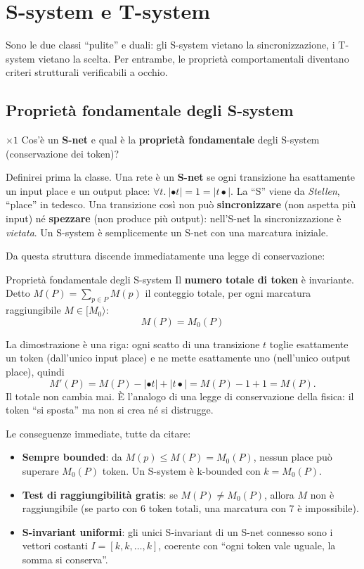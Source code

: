 \chapter{S-system e T-system}

Sono le due classi ``pulite'' e duali: gli S-system vietano la sincronizzazione, i T-system vietano la scelta. Per entrambe, le proprietà comportamentali diventano criteri strutturali verificabili a occhio.

\section{Proprietà fondamentale degli S-system}

\begin{domanda}{$\times 1$}
Cos'è un \textbf{S-net} e qual è la \textbf{proprietà fondamentale} degli S-system (conservazione dei token)?
\end{domanda}

Definirei prima la classe. Una rete è un \textbf{S-net} se ogni transizione ha esattamente un input place e un output place: $\forall t.\ |\bullet t| = 1 = |t\bullet|$. La ``S'' viene da \emph{Stellen}, ``place'' in tedesco. Una transizione così non può \textbf{sincronizzare} (non aspetta più input) né \textbf{spezzare} (non produce più output): nell'S-net la sincronizzazione è \emph{vietata}. Un S-system è semplicemente un S-net con una marcatura iniziale.

Da questa struttura discende immediatamente una legge di conservazione:

\begin{teorema}{Proprietà fondamentale degli S-system}
Il \textbf{numero totale di token} è invariante. Detto $M(P) = \sum_{p\in P} M(p)$ il conteggio totale, per ogni marcatura raggiungibile $M \in [M_0\rangle$:
$$M(P) = M_0(P)$$
\end{teorema}

La dimostrazione è una riga: ogni scatto di una transizione $t$ toglie esattamente un token (dall'unico input place) e ne mette esattamente uno (nell'unico output place), quindi
$$M'(P) = M(P) - |\bullet t| + |t\bullet| = M(P) - 1 + 1 = M(P).$$
Il totale non cambia mai. È l'analogo di una legge di conservazione della fisica: il token ``si sposta'' ma non si crea né si distrugge.

Le conseguenze immediate, tutte da citare:
\begin{itemize}
  \item \textbf{Sempre bounded}: da $M(p) \le M(P) = M_0(P)$, nessun place può superare $M_0(P)$ token. Un S-system è k-bounded con $k = M_0(P)$.
  \item \textbf{Test di raggiungibilità gratis}: se $M(P) \ne M_0(P)$, allora $M$ non è raggiungibile (se parto con 6 token totali, una marcatura con 7 è impossibile).
  \item \textbf{S-invariant uniformi}: gli unici S-invariant di un S-net connesso sono i vettori costanti $I = [k,k,\dots,k]$, coerente con ``ogni token vale uguale, la somma si conserva''.
\end{itemize}

